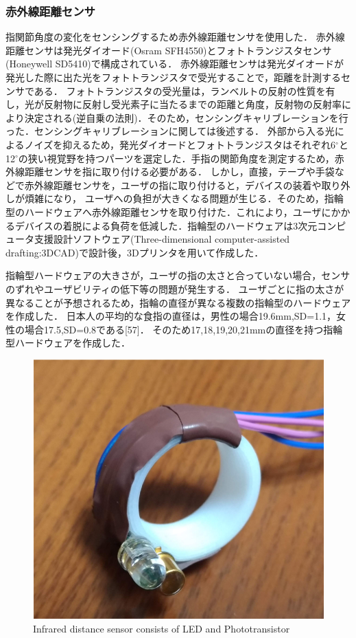 \subsubsection*{赤外線距離センサ}
指関節角度の変化をセンシングするため赤外線距離センサを使用した．
赤外線距離センサは発光ダイオード(Osram SFH4550)とフォトトランジスタセンサ(Honeywell SD5410)で構成されている．
赤外線距離センサは発光ダイオードが発光した際に出た光をフォトトランジスタで受光することで，距離を計測するセンサである．
フォトトランジスタの受光量は，ランベルトの反射の性質を有し，光が反射物に反射し受光素子に当たるまでの距離と角度，反射物の反射率により決定される(逆自乗の法則)．そのため，センシングキャリブレーションを行った．センシングキャリブレーションに関しては後述する．
外部から入る光によるノイズを抑えるため，発光ダイオードとフォトトランジスタはそれぞれ6$^\circ$と12$^\circ$の狭い視覚野を持つパーツを選定した．手指の関節角度を測定するため，赤外線距離センサを指に取り付ける必要がある．
しかし，直接，テープや手袋などで赤外線距離センサを，ユーザの指に取り付けると，デバイスの装着や取り外しが煩雑になり，
ユーザへの負担が大きくなる問題が生じる．そのため，指輪型のハードウェアへ赤外線距離センサを取り付けた．これにより，ユーザにかかるデバイスの着脱による負荷を低減した．指輪型のハードウェアは3次元コンピュータ支援設計ソフトウェア(Three-dimensional computer-assisted drafting:3DCAD)で設計後，3Dプリンタを用いて作成した．

指輪型ハードウェアの大きさが，ユーザの指の太さと合っていない場合，センサのずれやユーザビリティの低下等の問題が発生する．
ユーザごとに指の太さが異なることが予想されるため，指輪の直径が異なる複数の指輪型のハードウェアを作成した．
日本人の平均的な食指の直径は，男性の場合19.6mm,SD=1.1，女性の場合17.5,SD=0.8である[57]．
そのため17,18,19,20,21mmの直径を持つ指輪型ハードウェアを作成した．

\begin{figure}[H]
  \centering
  \includegraphics[width=0.8\linewidth]{fig/fal7}
  \caption{Infrared distance sensor consists of LED and Phototransistor}
  \label{fig:distance sensor}
\end{figure}

